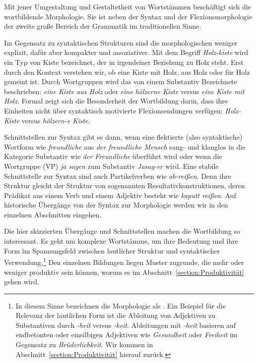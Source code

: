 Mit jener Umgestaltung und Gestaltetheit von Wortstämmen beschäftigt sich die wortbildende Morphologie. Sie ist neben der Syntax und der Flexionsmorphologie der zweite große Bereich der Grammatik im traditionellen Sinne.

Im Gegensatz zu syntaktischen Strukturen sind die morphologischen weniger explizit, dafür aber kompakter und assoziativer. Mit dem Begriff \textit{Holz-kiste} wird ein Typ von Kiste bezeichnet, der in irgendeiner Beziehung zu Holz steht. Erst durch den Kontext verstehen wir, ob eine Kiste mit Holz, aus Holz oder für Holz gemeint ist. Durch Wortgruppen wird das von einem Substantiv Bezeichnete beschrieben: \textit{eine Kiste aus Holz} oder \textit{eine hölzerne Kiste} versus \textit{eine Kiste mit Holz}. Formal zeigt sich die Besonderheit der Wortbildung darin, dass ihre Einheiten nicht über syntaktisch motivierte Flexionsendungen verfügen: \textit{Holz-Kiste} versus \textit{hölzern-e Kiste}.    

Schnittstellen zur Syntax gibt es dann, wenn eine flektierte (also syntaktische) Wortform wie \textit{freundliche} aus \textit{der freundliche Mensch} sang- und klanglos in die Kategorie Substantiv wie \textit{der Freundliche} überführt wird oder wenn die Wortgruppe (VP) \textit{ja sagen} zum Substantiv \textit{Jasag-er} wird. Eine stabile Schnittstelle zur Syntax sind auch Partikelverben wie \textit{ab-reißen}. Denn ihre Struktur gleicht der Struktur von sogenannten Resultativkonstruktionen, deren Prädikat aus einem Verb und einem Adjektiv besteht wie \textit{kaputt reißen}. Auf historische Übergänge von der Syntax zur Morphologie werden wir in den einzelnen Abschnitten eingehen.  

Die hier skizzierten Übergänge und Schnittstellen machen die Wortbildung so interessant. Es geht um komplexe Wortstämme, um ihre Bedeutung und ihre Form im Spannungsfeld zwischen lautlicher Struktur und syntaktischer Verwendung.\footnote{In diesem Sinne bezeichnen \citet[1]{SpencerZwicky1998} die Morphologie als . Ein Beispiel für die Relevanz der lautlichen Form ist die Ableitung von Adjektiven zu Substantiven durch \textit{-heit} versus \textit{-keit}. Ableitungen mit \textit{-heit} basieren auf endbetonten oder einsilbigen Adjektiven wie \textit{Gesundheit} oder \textit{Freiheit} im Gegensatz zu \textit{Brüderlichkeit}. Wir kommen in Abschnitt~\ref{section:Produktivität} hierauf zurück.} Den einzelnen Bildungen liegen Muster zugrunde, die mehr oder weniger produktiv sein können, worum es im Abschnitt~\ref{section:Produktivität} gehen wird.

